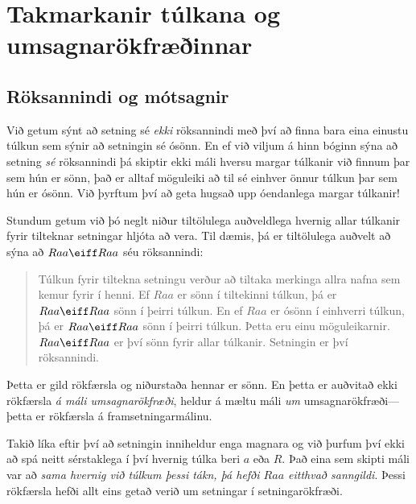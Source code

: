 \chapter{Takmarkanir túlkana og umsagnarökfræðinnar}

\section{Röksannindi og mótsagnir}
Við getum sýnt að setning sé \emph{ekki} röksannindi með því að finna bara eina einustu túlkun sem sýnir að setningin sé ósönn. En ef við viljum á hinn bóginn sýna að setning \emph{sé} röksannindi þá skiptir ekki máli hversu margar túlkanir við finnum þar sem hún er sönn, það er alltaf möguleiki að til sé einhver önnur túlkun þar sem hún er ósönn. Við þyrftum því að geta hugsað upp óendanlega margar túlkanir!

Stundum getum við þó neglt niður tiltölulega auðveldlega hvernig allar túlkanir fyrir tilteknar setningar hljóta að vera. Til dæmis, þá er tiltölulega auðvelt að sýna að $Raa\eiff Raa$ séu röksannindi: 
	\begin{quote}
		\label{allmodels1}
		Túlkun fyrir tiltekna setningu verður að tiltaka merkinga allra nafna sem kemur fyrir í henni. Ef $Raa$ er sönn í tiltekinni túlkun, þá er $Raa \eiff Raa$ sönn í þeirri túlkun. En ef $Raa$ er ósönn í einhverri túlkun, þá er $Raa \eiff Raa$ sönn í þeirri túlkun. Þetta eru einu möguleikarnir. $Raa \eiff Raa$ er því sönn fyrir allar túlkanir. Setningin er því röksannindi.
	\end{quote}
Þetta er gild rökfærsla og niðurstaða hennar er sönn. En þetta er auðvitað ekki rökfærsla \emph{á máli umsagnarökfræði}, heldur á mæltu máli \emph{um} umsagnarökfræði---þetta er rökfærsla á framsetningarmálinu.

Takið líka eftir því að setningin inniheldur enga magnara og við þurfum því ekki að spá neitt sérstaklega í því hvernig túlka beri $a$ eða $R$. Það eina sem skipti máli var að \emph{sama hvernig við túlkum þessi tákn, þá hefði $Raa$ eitthvað sanngildi}. Þessi rökfærsla hefði allt eins getað verið um setningar í setningarökfræði.	

